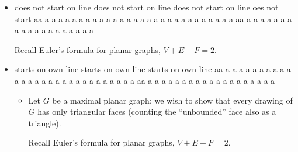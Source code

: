 \begin{itemize}

  \item does not start on line does not start on line does not start on line oes not start aa a a a a a a a a a a a a a a a a a a a a a a a a a a a a aa a a a a a a a a a a a a a a a a a a a  

    Recall Euler's formula for planar graphs, \(V+E-F=2\).
 \item 
   starts on own line
   starts on own line
   starts on own line aa a a a a a a a a a a a a a a a a a a a a a a a a a a a a aa a a a a a a a a a a a a a a a a a a a  
\begin{itemize}

  \item Let \(G\) be a maximal planar graph; we wish to show that every drawing of \(G\) has only triangular faces (counting the ``unbounded'' face also as a triangle).

    Recall Euler's formula for planar graphs, \(V+E-F=2\).

\end{itemize}

\end{itemize}
